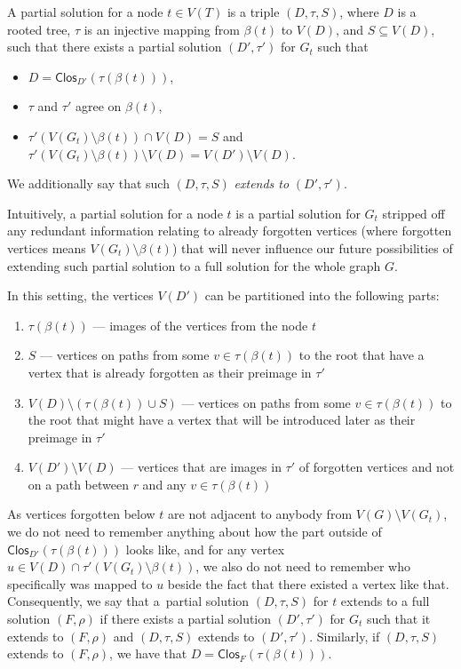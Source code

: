 \documentclass[a4paper,11pt]{article}
\begin{document}
\begin{definition} \label{def:partial-node}
A partial solution for a node $t \in V(T)$ is a triple $(D, \tau, S)$, where $D$ is a rooted tree, $\tau$ is an injective mapping from $\beta(t)$ to $V(D)$, and $S \subseteq V(D)$,
such that there exists a partial solution $(D', \tau')$ for $G_t$ such that 
%
\begin{itemize}
    \item $D = \mathsf{Clos}_{D'}(\tau(\beta(t)))$,
    \item $\tau$ and $\tau'$ agree on $\beta(t)$,
    \item $\tau'(V(G_t) \setminus \beta(t)) \cap V(D) = S$ and $\tau'(V(G_t) \setminus \beta(t)) \setminus V(D) = V(D') \setminus V(D)$.
\end{itemize}   
%
We additionally say that such $(D, \tau, S)$ \emph{extends to} $(D', \tau')$.
\end{definition}

Intuitively, a partial solution for a node $t$ is a partial solution for $G_t$ stripped off any redundant information relating to already forgotten vertices (where forgotten vertices means $V(G_t) \setminus \beta(t)$) that will never influence our future possibilities of extending such partial solution to a full solution for the whole graph $G$.

In this setting, the vertices $V(D')$ can be partitioned into the following parts:
\begin{enumerate}
    \item $\tau(\beta(t))$ --- images of the vertices from the node $t$
    \item $S$ --- vertices on paths from some $v \in \tau(\beta(t))$ to the root that have a vertex that is already forgotten as their preimage in $\tau'$
    \item $V(D) \setminus (\tau(\beta(t)) \cup S)$ --- vertices on paths from some $v \in \tau(\beta(t))$ to the root that might have a vertex that will be introduced later as their preimage in $\tau'$
    \item $V(D') \setminus V(D)$ --- vertices that are images in $\tau'$ of forgotten vertices and not on a path between $r$ and any $v \in \tau(\beta(t))$
\end{enumerate}
As vertices forgotten below $t$ are not adjacent to anybody from $V(G) \setminus V(G_t)$, we do not need to remember anything about how the part outside of $\mathsf{Clos}_{D'}(\tau(\beta(t)))$ looks like, and for any vertex $u \in V(D) \cap \tau'(V(G_t) \setminus \beta(t))$, we also do not need to remember who specifically was mapped to $u$ beside the fact that there existed a vertex like that. Consequently, we say that a~partial solution $(D, \tau, S)$ for $t$ extends to a full solution $(F, \rho)$ if there exists a partial solution $(D', \tau')$ for $G_t$ such that it extends to $(F, \rho)$ and $(D, \tau, S)$ extends to $(D', \tau')$. Similarly, if $(D, \tau, S)$ extends to $(F, \rho)$, we have that $D = \mathsf{Clos}_F(\tau(\beta(t)))$.
\end{document}
